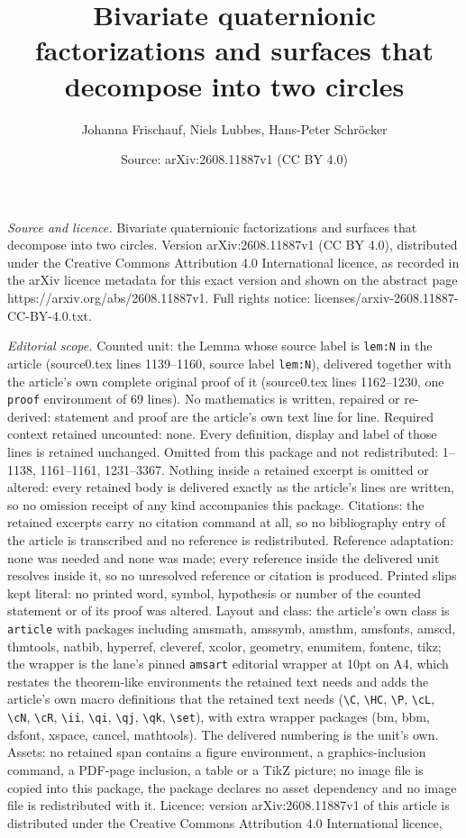 \documentclass[10pt,a4paper]{amsart}
\title[Bivariate quaternionic factorizations and surfaces that deco]{Bivariate quaternionic factorizations and surfaces that decompose into two circles}
\author{Johanna Frischauf, Niels Lubbes, Hans-Peter Schr\"ocker}
\date{Source: arXiv:2608.11887v1 (CC BY 4.0)}
\begin{document}
\maketitle

\noindent\emph{Source and licence.} Bivariate quaternionic factorizations and surfaces that decompose into two circles. Version arXiv:2608.11887v1 (CC BY 4.0), distributed under the Creative Commons Attribution 4.0 International licence, as recorded in the arXiv licence metadata for this exact version and shown on the abstract page https://arxiv.org/abs/2608.11887v1. Full rights notice: licenses/arxiv-2608.11887-CC-BY-4.0.txt.\par\smallskip

\noindent\textit{Editorial scope.} Counted unit: the Lemma whose source label is \texttt{lem:N} in the article (source0.tex lines 1139--1160, source label \texttt{lem:N}), delivered together with the article's own complete original proof of it (source0.tex lines 1162--1230, one \texttt{proof} environment of 69 lines). No mathematics is written, repaired or re-derived: statement and proof are the article's own text line for line. Required context retained uncounted: none. Every definition, display and label of those lines is retained unchanged. Omitted from this package and not redistributed: 1--1138, 1161--1161, 1231--3367. Nothing inside a retained excerpt is omitted or altered: every retained body is delivered exactly as the article's lines are written, so no omission receipt of any kind accompanies this package. Citations: the retained excerpts carry no citation command at all, so no bibliography entry of the article is transcribed and no reference is redistributed. Reference adaptation: none was needed and none was made; every reference inside the delivered unit resolves inside it, so no unresolved reference or citation is produced. Printed slips kept literal: no printed word, symbol, hypothesis or number of the counted statement or of its proof was altered. Layout and class: the article's own class is \texttt{article} with packages including amsmath, amssymb, amsthm, amsfonts, amscd, thmtools, natbib, hyperref, cleveref, xcolor, geometry, enumitem, fontenc, tikz; the wrapper is the lane's pinned \texttt{amsart} editorial wrapper at 10pt on A4, which restates the theorem-like environments the retained text needs and adds the article's own macro definitions that the retained text needs (\texttt{\textbackslash C}, \texttt{\textbackslash HC}, \texttt{\textbackslash P}, \texttt{\textbackslash cL}, \texttt{\textbackslash cN}, \texttt{\textbackslash cR}, \texttt{\textbackslash ii}, \texttt{\textbackslash qi}, \texttt{\textbackslash qj}, \texttt{\textbackslash qk}, \texttt{\textbackslash set}), with extra wrapper packages (bm, bbm, dsfont, xspace, cancel, mathtools). The delivered numbering is the unit's own. Assets: no retained span contains a figure environment, a graphics-inclusion command, a PDF-page inclusion, a table or a TikZ picture; no image file is copied into this package, the package declares no asset dependency and no image file is redistributed with it. Licence: version arXiv:2608.11887v1 of this article is distributed under the Creative Commons Attribution 4.0 International licence, 
\end{document}
